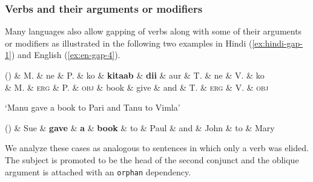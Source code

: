 \documentclass[lucida,biblatex]{sp} %
\newcounter{excounter}
\begin{document}
\subsubsection{Verbs and their arguments or modifiers}

Many languages also allow gapping of verbs along with some of their arguments 
or modifiers as illustrated in the following two examples in Hindi (\ref{ex:hindi-gap-1}) 
and English (\ref{ex:en-gap-4}).



\begin{center}
  \label{ex:hindi-gap-1}
  \footnotesize
  \begin{dependency}[edge unit distance=2.5ex]
    \begin{deptext}[column sep=0.1cm]
      (\theexcounter)  
     \& M. \& ne \& P. \& ko \& \textbf{kitaab} \& \textbf{dii} \& aur \&  T. \& ne \& V. \& ko  \\
      \&          M. \& \tiny{\textsc{erg}} \& P. \& \tiny{\textsc{obj}} \& book \& give \& and \& T. \& \tiny{\textsc{erg}} \& V. \&  \tiny{\textsc{obj}}  \\
     \end{deptext}
  \end{dependency}
  \trans `Manu gave a book to Pari and Tanu to Vimla' \\ \normalsize \null  \hfill \citep{Kush2016}
\end{center}

\begin{center}
  \label{ex:en-gap-4}
  \footnotesize
  \begin{dependency}[edge unit distance=2.5ex]
    \begin{deptext}[column sep=0.085cm]
      (\theexcounter) 
     \& Sue \& \textbf{gave} \& \textbf{a} \& \textbf{book} \& to \& Paul \& and \& John \& to \& Mary \\
    \end{deptext}
  \end{dependency}
\end{center}
We analyze these cases as analogous to sentences in which only a verb was elided. 
The subject is promoted to be the head of the second conjunct and the oblique 
argument is attached with an \texttt{orphan} dependency.
\end{document}
